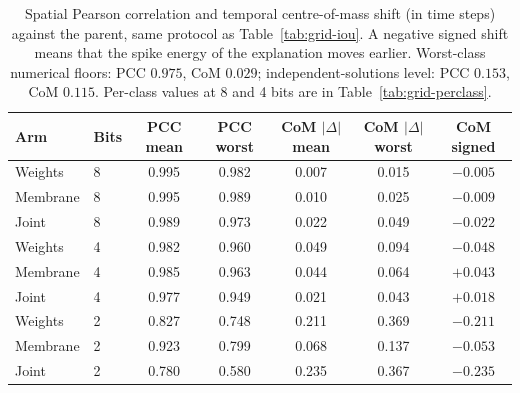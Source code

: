 \begin{table}[htbp]
\centering
\small
\begin{tabular}{llccccc}
\toprule
Arm & Bits & PCC mean & PCC worst & CoM $|\Delta|$ mean & CoM $|\Delta|$ worst & CoM signed \\
\midrule
Weights  & 8 & 0.995 & 0.982 & 0.007 & 0.015 & $-0.005$ \\
Membrane & 8 & 0.995 & 0.989 & 0.010 & 0.025 & $-0.009$ \\
Joint    & 8 & 0.989 & 0.973 & 0.022 & 0.049 & $-0.022$ \\
\midrule
Weights  & 4 & 0.982 & 0.960 & 0.049 & 0.094 & $-0.048$ \\
Membrane & 4 & 0.985 & 0.963 & 0.044 & 0.064 & $+0.043$ \\
Joint    & 4 & 0.977 & 0.949 & 0.021 & 0.043 & $+0.018$ \\
\midrule
Weights  & 2 & 0.827 & 0.748 & 0.211 & 0.369 & $-0.211$ \\
Membrane & 2 & 0.923 & 0.799 & 0.068 & 0.137 & $-0.053$ \\
Joint    & 2 & 0.780 & 0.580 & 0.235 & 0.367 & $-0.235$ \\
\bottomrule
\end{tabular}
\caption{Spatial Pearson correlation and temporal centre-of-mass shift (in time
steps) against the parent, same protocol as Table~\ref{tab:grid-iou}. A negative
signed shift means that the spike energy of the explanation moves earlier.
Worst-class numerical floors: PCC $0.975$, CoM $0.029$; independent-solutions
level: PCC $0.153$, CoM $0.115$. Per-class values at 8 and 4 bits are in
Table~\ref{tab:grid-perclass}.}
\label{tab:grid-pcc-com}
\end{table}

